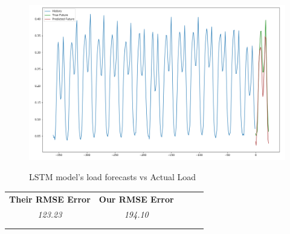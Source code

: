 \begin{figure}[h!]
\centering
\includegraphics[width=0.9\linewidth]{project/nn.PNG}
\label{fig:felix}
\caption{LSTM model's load forecasts vs Actual Load}
\end{figure}
\begin{table}[h!]
\centering
\begin{tabular}{lllll}
\cline{1-2}
\multicolumn{1}{|l|}{\textbf{Their RMSE Error}} & \multicolumn{1}{l|}{\textbf{Our RMSE Error}} &  &  &  \\ \cline{1-2}
\multicolumn{1}{|c|}{\textit{123.23}} & \multicolumn{1}{c|}{\textit{194.10}} &  &  &  \\ \cline{1-2}
                                &                                &  &  &  \\
                                &                                &  &  & 
\end{tabular}
\end{table}
\newpage
